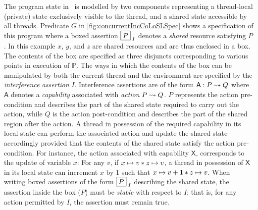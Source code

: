 The program state in \colosl\ is modelled by two components representing a thread-local (private) state exclusively visible to the thread, and a shared state accessible by all threads.
Predicate $G$ in \fig\ref{fig:concurrentIncCoLoSLSpec} shows a specification of this program where a boxed assertion $\boxed{P}_{\; I}$ denotes a \emph{shared} resource satisfying $P$. In this example $x$, $y$, and $z$ are shared resources and are thus enclosed in a box. The contents of the box are specified as three disjuncts corresponding to various points in execution of $\mathbb{P}$. 
The ways in which the contents of the box can be manipulated by both the current thread and the environment are specified by the \emph{interference assertion} $I$. Interference assertions are of the form $\textsf{A}: P \rightsquigarrow Q$ where $\textsf{A}$ denotes a \emph{capability} associated with \emph{action} $P \rightsquigarrow Q$. $P$ represents the action pre-condition and describes the part of the shared state required to carry out the action, while $Q$ is the action post-condition and describes the part of the shared region after the action. 
A thread in possession of the required capability in its local state can perform the associated action and update the shared state accordingly provided that the contents of the shared state satisfy the action pre-condition.
For instance, the action associated with capability $\textsf{X}$, corresponds to the update of variable $x$: For any $v$, if $x \mapsto v * z \mapsto v$, a thread in possession of $\textsf{X}$ in its local state can increment $x$ by 1 such that $x \mapsto v+1 * z \mapsto v$. 
When writing boxed assertions of the form $\boxed{P}_{\; I}$ describing the shared state, the assertion inside the box ($P$) must be \emph{stable} with respect to $I$; that is, for any action permitted by $I$, the assertion must remain true. 
%
%
